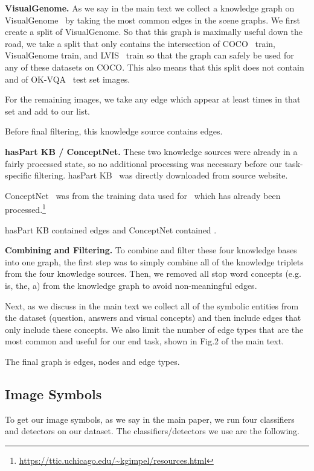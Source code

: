 \documentclass[final]{cvpr}
\providecommand{\myparagraph}[1]{\noindent\textbf{#1.}}
\begin{document}
\myparagraph{VisualGenome}
As we say in the main text we collect a knowledge graph on VisualGenome~\cite{krishnavisualgenome} by taking the most common edges in the scene graphs. We first create a split of VisualGenome. So that this graph is maximally useful down the road, we take a split that only contains the intersection of COCO~\cite{LinMBHPRDZ14} train, VisualGenome train, and LVIS~\cite{gupta2019lvis} train so that the graph can safely be used for any of these datasets on COCO. This also means that this split does not contain and of OK-VQA~\cite{marino19cvpr} test set images.

For the remaining images, we take any edge which appear at least  times in that set and add to our list.

Before final filtering, this knowledge source contains  edges.

\myparagraph{hasPart KB / ConceptNet}
These two knowledge sources were already in a fairly processed state, so no additional processing was necessary before our task-specific filtering. hasPart KB~\cite{bhakthavatsalam2020dogs} was directly downloaded from source website.

ConceptNet~\cite{liu2004conceptnet} was from the training data used for~\cite{li2016commonsense} which has already been processed.\footnote{\url{https://ttic.uchicago.edu/~kgimpel/resources.html}}

hasPart KB contained  edges and ConceptNet contained .

\myparagraph{Combining and Filtering}
To combine and filter these four knowledge bases into one graph, the first step was to simply combine all of the knowledge triplets from the four knowledge sources. Then, we removed all stop word concepts (e.g. is, the, a) from the knowledge graph to avoid non-meaningful edges.

Next, as we discuss in the main text we collect all of the symbolic entities from the dataset (question, answers and visual concepts) and then include edges that only include these concepts. We also limit the number of  edge types that are the most common and useful for our end task, shown in Fig.2 of the main text.

The final graph is  edges,  nodes and  edge types.

\subsection{Image Symbols}
\label{appx:imagesymbols}
To get our image symbols, as we say in the main paper, we run four classifiers and detectors on our dataset. The classifiers/detectors we use are the following.
\end{document}
